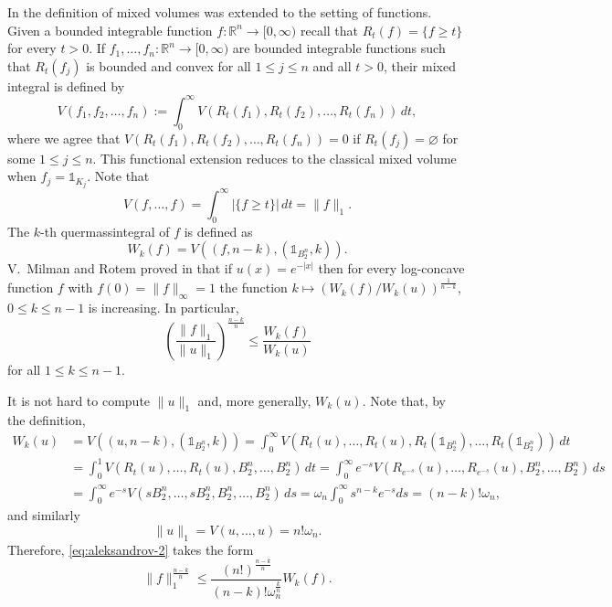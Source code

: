 \documentclass[11pt,leqno]{article}
\theoremstyle{definition}
\theoremstyle{remark}
\numberwithin{equation}{section}
\newcommand{\ls}{\leqslant}
\newcommand{\gr}{\geqslant}
\newcommand{\1}{\textbf{1}}
\begin{document}
In \cite{VMilman-Rotem-2013} the definition of mixed volumes was extended to the setting of functions. Given a bounded
integrable function $f:{\mathbb R}^n\to [0,\infty)$ recall that $R_t(f)=\{f\gr t\}$ for every $t>0$.
If $f_1,\ldots ,f_n:{\mathbb R}^n\to [0,\infty)$ are bounded integrable functions such that
$R_t(f_j)$ is bounded and convex for all $1\ls j\ls n$ and all $t>0$, their mixed integral is defined by
$$V(f_1,f_2,\ldots ,f_n):=\int_0^{\infty}V(R_t(f_1),R_t(f_2),\ldots ,R_t(f_n))\,dt,$$
where we agree that $V(R_t(f_1),R_t(f_2),\ldots ,R_t(f_n))=0$ if $R_t(f_j)=\varnothing$ for some $1\ls j\ls n$. This functional extension reduces 
to the classical mixed volume when $f_j=\mathds{1}_{K_j}$. Note that
$$V(f,\ldots ,f)=\int_0^{\infty}|\{f\gr t\}|\,dt=\|f\|_1.$$
The $k$-th quermassintegral of $f$ is defined as
$$W_k(f)=V((f,n-k),(\mathds{1}_{B_2^n},k)).$$
V.~Milman and Rotem proved in \cite{VMilman-Rotem-2013} that if $u(x)=e^{-|x|}$ then for every
log-concave function $f$ with $f(0)=\|f\|_{\infty}=1$ the function
$k\mapsto \left(W_k(f)/W_k(u)\right)^{\frac{1}{n-k}}$, $0\ls k\ls n-1$
is increasing. In particular,
\begin{equation}\label{eq:aleksandrov-2}\left(\frac{\|f\|_1}{\|u\|_1}\right)^{\frac{n-k}{n}}\ls\frac{W_k(f)}{W_k(u)}\end{equation}
for all $1\ls k\ls n-1$.

It is not hard to compute $\|u\|_1$ and, more generally, $W_k(u)$. Note that, by the definition,
\begin{align*}
W_k(u) &=V((u,n-k),(\mathds{1}_{B_2^n},k)) =\int_0^{\infty}V(R_t(u),\ldots ,R_t(u),R_t(\mathds{1}_{B_2^n}),\ldots ,R_t(\mathds{1}_{B_2^n}))\,dt\\
&=\int_0^1V(R_t(u),\ldots ,R_t(u),B_2^n,\ldots ,B_2^n)\,dt
=\int_0^{\infty}e^{-s}V(R_{e^{-s}}(u),\ldots ,R_{e^{-s}}(u),B_2^n,\ldots ,B_2^n)\,ds\\
&=\int_0^{\infty}e^{-s}V(sB_2^n,\ldots ,sB_2^n,B_2^n,\ldots ,B_2^n)\,ds
=\omega_n\int_0^{\infty}s^{n-k}e^{-s}ds=(n-k)!\omega_n,
\end{align*}
and similarly
$$\|u\|_1=V(u,\ldots ,u)=n!\omega_n.$$
Therefore, \eqref{eq:aleksandrov-2} takes the form
\begin{equation}\label{eq:aleksandrov-3}\|f\|_1^{\frac{n-k}{n}}
\ls\frac{(n!)^{\frac{n-k}{n}}}{(n-k)!\omega_n^{\frac{k}{n}}}W_k(f).\end{equation}
\end{document}
